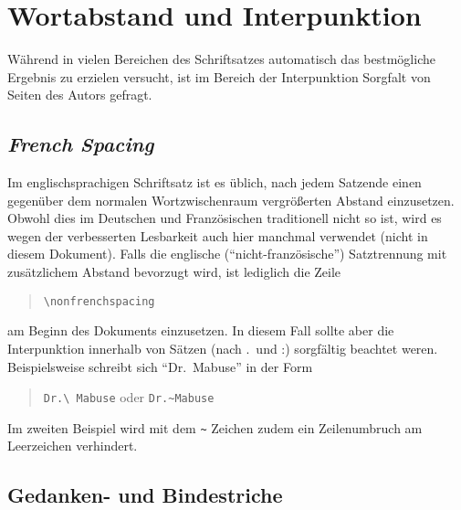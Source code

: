 \section{Wortabstand und Interpunktion}

Während \latex in vielen Bereichen des Schriftsatzes automatisch das bestmögliche Ergebnis zu erzielen versucht, ist im Bereich der Interpunktion Sorgfalt von Seiten des Autors gefragt.

\subsection{\emph{French Spacing}}

Im englischsprachigen Schriftsatz ist es üblich, nach jedem
Satzende einen gegenüber dem normalen Wortzwischenraum
vergrößerten Abstand einzusetzen. Obwohl dies im Deutschen und
Französischen traditionell nicht so ist, wird es wegen der
verbesserten Lesbarkeit auch hier manchmal verwendet (nicht in diesem
Dokument). Falls die englische ("`nicht-französische"') Satztrennung mit
zusätzlichem Abstand bevorzugt wird, ist lediglich die Zeile
%
\begin{quote}
\verb!\nonfrenchspacing!
\end{quote}
%
am Beginn des Dokuments einzusetzen. 
In diesem Fall sollte 
aber die Interpunktion innerhalb von
Sätzen (nach .\ und :) sorgfältig beachtet weren. Beispielsweise
schreibt sich "`Dr.\ Mabuse"' in der Form
%
\begin{quote}
\verb!Dr.\ Mabuse! oder \verb!Dr.~Mabuse!
\end{quote}
%
Im zweiten Beispiel wird mit dem \verb!~! Zeichen zudem ein Zeilenumbruch am Leerzeichen verhindert.


\subsection{Gedanken- und Bindestriche}
\label{sec:gedankenstrich}

